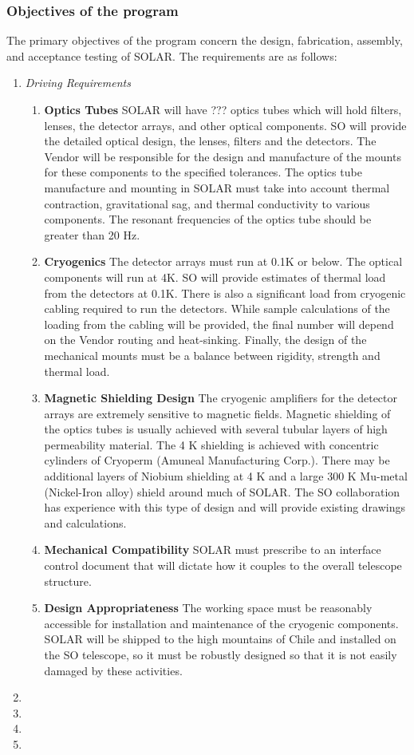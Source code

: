 \documentclass[12pt,letter]{article}
\begin{document}
    \subsubsection{Objectives of the program}
    The primary objectives of the program concern the design, fabrication, assembly, and acceptance testing of SOLAR. The requirements are as follows:
    \begin{enumerate}
    \item {\it Driving Requirements}
    	\begin{enumerate}
        \item {\bf Optics Tubes} SOLAR will have ??? optics tubes which will hold filters, lenses, the detector arrays, and other optical components. SO will provide the detailed optical design, the lenses, filters and the detectors. The Vendor will be responsible for the design and manufacture of the mounts for these components to the specified tolerances. The optics tube manufacture and mounting in SOLAR must take into account thermal contraction, gravitational sag, and thermal conductivity to various components. The resonant frequencies of the optics tube should be greater than 20 Hz.
        \item {\bf Cryogenics} The detector arrays must run at 0.1K or below. The optical components will run at 4K. SO will provide estimates of thermal load from the detectors at 0.1K. There is also a significant load from cryogenic cabling required to run the detectors. While sample calculations of the loading from the cabling will be provided, the final number will depend on the Vendor routing and heat-sinking. Finally, the design of the mechanical mounts must be a balance between rigidity, strength and thermal load. 
        \item {\bf Magnetic Shielding Design} The cryogenic amplifiers for the detector arrays are extremely sensitive to magnetic fields. Magnetic shielding of the optics tubes is usually achieved with several tubular layers of high permeability material. The 4 K shielding is achieved with concentric cylinders of Cryoperm (Amuneal Manufacturing Corp.). There may be additional layers of Niobium shielding at 4 K and a large 300 K Mu-metal (Nickel-Iron alloy) shield around much of SOLAR. The SO collaboration has experience with this type of design and will provide existing drawings and calculations.
        \item {\bf Mechanical Compatibility} SOLAR must prescribe to an interface control document that will dictate how it couples to the overall telescope structure.
        \item {\bf Design Appropriateness} The working space must be reasonably accessible for installation and maintenance of the cryogenic components. SOLAR will be shipped to the high mountains of Chile and installed on the SO telescope, so it must be robustly designed so that it is not easily damaged by these activities.
        \end{enumerate}
    \item
    \item
    \item
    \item
    \end{enumerate}
\end{document}
